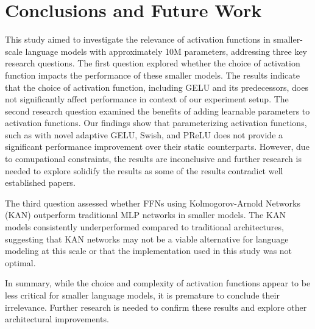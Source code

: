 \section{Conclusions and Future Work} %
\label{sec:conclusion}
This study aimed to investigate the relevance of activation functions in smaller-scale language models with approximately 10M parameters, addressing three key research questions. The first question explored whether the choice of activation function impacts the performance of these smaller models. The results indicate that the choice of activation function, including GELU and its predecessors, does not significantly affect performance in context of our experiment setup. The second research question examined the benefits of adding learnable parameters to activation functions. Our findings show that parameterizing activation functions, such as with novel adaptive GELU, Swish, and PReLU does not provide a significant performance improvement over their static counterparts. However, due to comupational constraints, the results are inconclusive and further research is needed to explore solidify the results as some of the results contradict well established papers.
 
The third question assessed whether FFNs using Kolmogorov-Arnold Networks (KAN) outperform traditional MLP networks in smaller models. The KAN models consistently underperformed compared to traditional architectures, suggesting that KAN networks may not be a viable alternative for language modeling at this scale or that the implementation used in this study was not optimal.

In summary, while the choice and complexity of activation functions appear to be less critical for smaller language models, it is premature to conclude their irrelevance. Further research is needed to confirm these results and explore other architectural improvements.